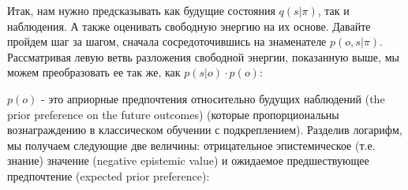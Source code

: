 \documentclass[twoside,leqno, 11pt]{article}
\begin{document}
	Итак, нам нужно предсказывать как будущие состояния $q(s|\pi)$, так и наблюдения. А также оценивать свободную энергию на их основе. Давайте пройдем шаг за шагом, сначала сосредоточившись на знаменателе $p(o,s|\pi)$. Рассматривая левую ветвь разложения свободной энергии, показанную выше, мы можем преобразовать ее так же, как $p(s|o) \cdot p(o)$:
	
	
	\begin{figure}[h]
	\end{figure}
	
	$p(o)$ - это априорные предпочтения относительно будущих наблюдений (the prior preference on the future outcomes) (которые пропорциональны вознаграждению в классическом обучении с подкреплением). Разделив логарифм, мы получаем следующие две величины:  отрицательное эпистемическое (т.е. знание) значение (negative epistemic value) и ожидаемое предшествующее предпочтение (expected prior preference):
	
	
	\begin{figure}[h]
	\end{figure}
	
\end{document}

